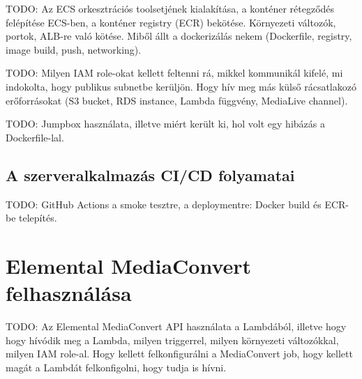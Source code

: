TODO: Az ECS orkesztrációs toolsetjének kialakítása, a konténer rétegződés felépítése ECS-ben, a konténer registry (ECR) bekötése. Környezeti változók, portok, ALB-re való kötése. Miből állt a dockerizálás nekem (Dockerfile, registry, image build, push, networking).

TODO: Milyen IAM role-okat kellett feltenni rá, mikkel kommunikál kifelé, mi indokolta, hogy publikus subnetbe kerüljön. Hogy hív meg más külső rácsatlakozó erőforrásokat (S3 bucket, RDS instance, Lambda függvény, MediaLive channel).

TODO: Jumpbox használata, illetve miért került ki, hol volt egy hibázás a Dockerfile-lal.

\subsection{A szerveralkalmazás CI/CD folyamatai}

TODO: GitHub Actions a smoke tesztre, a deploymentre: Docker build és ECR-be telepítés.

\section{Elemental MediaConvert felhasználása}

TODO: Az Elemental MediaConvert API használata a Lambdából, illetve hogy hogy hívódik meg a Lambda, milyen triggerrel, milyen környezeti változókkal, milyen IAM role-al. Hogy kellett felkonfigurálni a MediaConvert job, hogy kellett magát a Lambdát felkonfigolni, hogy tudja is hívni.
